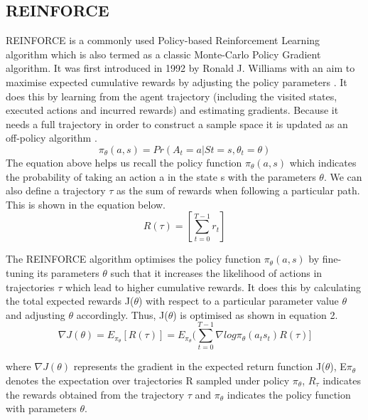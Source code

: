 \documentclass{article}
\begin{document}
\subsection{REINFORCE}
\par REINFORCE is a commonly used Policy-based Reinforcement Learning algorithm which is also termed as a classic Monte-Carlo Policy Gradient algorithm. It was first introduced in 1992 by Ronald J. Williams with an aim to maximise expected cumulative rewards by adjusting the policy parameters \citep{ronaldwilliams}. It does this by learning from the agent trajectory (including the visited states, executed actions and incurred rewards) and estimating gradients. Because it needs a full trajectory in order to construct a sample space it is updated as an off-policy algorithm \citep{sutton-barlo}. 
\begin{equation}
\pi_\theta(a, s) = Pr(A_t = a | St = s, \theta_t = \theta)
\end{equation}
The equation above helps us recall the policy function $\pi_{\theta}(a, s)$ which indicates the probability of taking an action a in the state s with the parameters $\theta$.
We can also define a trajectory $\tau$ as the sum of rewards when following a particular path. This is shown in the equation below.
\begin{equation}
R(\tau) = [\sum_{t=0}^{T-1}r_t] 
\end{equation}

\par The REINFORCE algorithm optimises the policy function $\pi_{\theta}(a,s)$ by fine-tuning its parameters $\theta$ such that it increases the likelihood of actions in trajectories $\tau$ which lead to higher cumulative rewards. It does this by calculating the total expected rewards J($\theta$) with respect to a particular parameter value $\theta$ and adjusting $\theta$ accordingly. Thus, J($\theta$) is optimised as shown in equation 2.
\begin{equation}
\nabla J(\theta) = E_{\pi_\theta}[ R(\tau)] =   E_{\pi_\theta} (\sum_{t=0}^{T-1} \nabla log\pi_\theta(a_t s_t) R(\tau)]
\end{equation}

where $\nabla J(\theta)$ represents the gradient in the expected return function J($\theta$), E$\pi_\theta$ denotes the expectation over trajectories R sampled under policy $\pi_\theta$, $R_{\tau}$ indicates the rewards obtained from the trajectory $\tau$ and $\pi_\theta$ indicates the policy function with parameters $\theta$.  \newline
\end{document}
